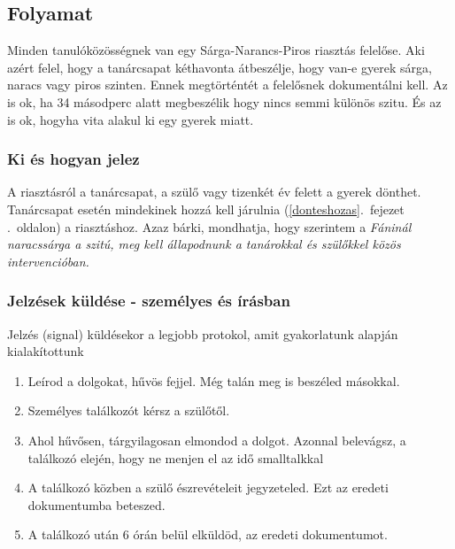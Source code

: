 \hypertarget{folyamat}{%
\subsection{Folyamat}\label{folyamat}}

Minden tanulóközösségnek van egy Sárga-Narancs-Piros riasztás felelőse.
Aki azért felel, hogy a tanárcsapat kéthavonta átbeszélje, hogy van-e
gyerek sárga, naracs vagy piros szinten. Ennek megtörténtét a felelősnek
dokumentálni kell. Az is ok, ha 34 másodperc alatt megbeszélik hogy
nincs semmi különös szitu. És az is ok, hogyha vita alakul ki egy gyerek
miatt.

\hypertarget{ki-es-hogyan-jelez}{%
\subsubsection{Ki és hogyan jelez}\label{ki-es-hogyan-jelez}}

A riasztásról a tanárcsapat, a szülő vagy tizenkét év felett a gyerek
dönthet. Tanárcsapat esetén
mindekinek hozzá kell járulnia (\ref{donteshozas}.~fejezet .~oldalon)
a riasztáshoz. Azaz bárki, mondhatja, hogy szerintem a \emph{Fáninál
naracssárga a szitú, meg kell állapodnunk a tanárokkal és szülőkkel
közös intervencióban.}

\hypertarget{jelzesek-kuldese---szemelyes-es-irasban}{%
\subsubsection{Jelzések küldése - személyes és
írásban}\label{jelzesek-kuldese---szemelyes-es-irasban}}

Jelzés (signal) küldésekor a legjobb protokol, amit gyakorlatunk alapján
kialakítottunk

\begin{enumerate}
\def\labelenumi{\arabic{enumi}.}
\tightlist
\item
  Leírod a dolgokat, hűvös fejjel. Még talán meg is beszéled másokkal.
\item
  Személyes találkozót kérsz a szülőtől.
\item
  Ahol hűvősen, tárgyilagosan elmondod a dolgot. Azonnal belevágsz, a
  találkozó elején, hogy ne menjen el az idő smalltalkkal
\item
  A találkozó közben a szülő észrevételeit jegyzeteled. Ezt az eredeti
  dokumentumba beteszed.
\item
  A találkozó után 6 órán belül elküldöd, az eredeti dokumentumot.
\end{enumerate}

